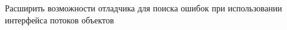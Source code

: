 \begin{frame}
	\frametitle{\insertsection} 
	\framesubtitle{\insertsubsection}
	Расширить возможности отладчика для поиска ошибок при использовании интерфейса потоков объектов
\end{frame}
